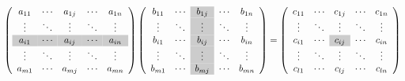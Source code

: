 \documentclass[a4paper,10pt]{jsarticle}
\begin{document}
\begin{equation*}
\left(
\begin{array}{ccccc}
  a_{11} & \cdots & a_{1j} & \cdots & a_{1n} \\
  \vdots & \ddots & \vdots & \ddots & \vdots \\
\rowcolor[gray]{0.8} a_{i1} & \cdots & a_{ij} & \cdots & a_{in} \\
  \vdots & \ddots & \vdots & \ddots & \vdots \\
  a_{m1} & \cdots & a_{mj} & \cdots & a_{mn}
\end{array}
\right)
\left(
\begin{array}{cc>{\columncolor[gray]{.8}}ccc}
  b_{11} & \cdots & b_{1j} & \cdots & b_{1n} \\
  \vdots & \ddots & \vdots & \ddots & \vdots \\
  b_{i1} & \cdots & b_{ij} & \cdots & b_{in} \\
  \vdots & \ddots & \vdots & \ddots & \vdots \\
  b_{m1} & \cdots & b_{mj} & \cdots & b_{mn}
\end{array}
\right)=
\left(
\begin{array}{ccccc}
  c_{11} & \cdots & c_{1j} & \cdots & c_{1n} \\
  \vdots & \ddots & \vdots & \ddots & \vdots \\
  c_{i1} & \cdots & \cellcolor[gray]{.8}c_{ij} & \cdots & c_{in} \\
  \vdots & \ddots & \vdots & \ddots & \vdots \\
  c_{l1} & \cdots & c_{lj} & \cdots & c_{ln}
\end{array}
\right)
\end{equation*}
\end{document}

